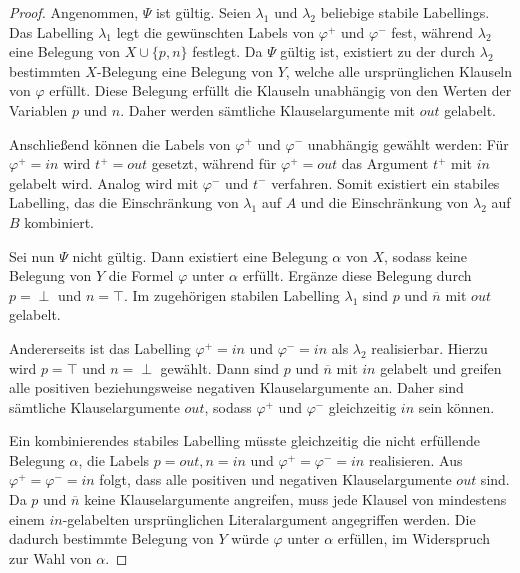 \begin{proof}
    Angenommen, \(\Psi\) ist gültig. Seien \(\lambda_1\) und \(\lambda_2\) beliebige
    stabile Labellings. Das Labelling \(\lambda_1\) legt die gewünschten Labels von
    \(\varphi^{+}\) und \(\varphi^{-}\) fest, während \(\lambda_2\) eine Belegung von
    \(X\cup\{p,n\}\) festlegt. Da \(\Psi\) gültig ist, existiert zu der durch
    \(\lambda_2\) bestimmten \(X\)-Belegung eine Belegung von \(Y\), welche alle
    ursprünglichen Klauseln von \(\varphi\) erfüllt. Diese Belegung erfüllt die
    Klauseln unabhängig von den Werten der Variablen \(p\) und \(n\). Daher werden
    sämtliche Klauselargumente mit \(out\) gelabelt.

    Anschließend können die Labels von \(\varphi^{+}\) und \(\varphi^{-}\) unabhängig
    gewählt werden: Für \(\varphi^{+}=in\) wird \(t^{+}=out\) gesetzt, während für
    \(\varphi^{+}=out\) das Argument \(t^{+}\) mit \(in\) gelabelt wird. Analog wird
    mit \(\varphi^{-}\) und \(t^{-}\) verfahren. Somit existiert ein stabiles Labelling,
    das die Einschränkung von \(\lambda_1\) auf \(A\) und die Einschränkung von
    \(\lambda_2\) auf \(B\) kombiniert.

    Sei nun \(\Psi\) nicht gültig. Dann existiert eine Belegung
    \(\alpha\) von \(X\), sodass keine Belegung von \(Y\) die Formel \(\varphi\)
    unter \(\alpha\) erfüllt. Ergänze diese Belegung durch \(p=\perp\) und \(n=\top\).
    Im zugehörigen stabilen Labelling \(\lambda_1\) sind \(p\) und \(\overline{n}\) mit \(out\)
    gelabelt.

    Andererseits ist das Labelling
    \(\varphi^{+}=in\) und \(\varphi^{-}=in\) als \(\lambda_2\) realisierbar. Hierzu wird
    \(p=\top\) und \(n=\perp\) gewählt. Dann sind \(p\) und \(\overline{n}\) mit
    \(in\) gelabelt und greifen alle positiven beziehungsweise negativen
    Klauselargumente an. Daher sind sämtliche Klauselargumente \(out\), sodass
    \(\varphi^{+}\) und \(\varphi^{-}\) gleichzeitig \(in\) sein können.

    Ein kombinierendes stabiles Labelling müsste gleichzeitig die nicht erfüllende
    Belegung \(\alpha\), die Labels \(p=out,n=in\) und
    \(\varphi^{+}=\varphi^{-}=in\) realisieren. Aus
    \(\varphi^{+}=\varphi^{-}=in\) folgt, dass alle positiven und negativen
    Klauselargumente \(out\) sind. Da \(p\text{ und } \overline{n}\) keine Klauselargumente
    angreifen, muss jede Klausel von mindestens einem \(in\)-gelabelten ursprünglichen
    Literalargument angegriffen werden. Die dadurch bestimmte Belegung von \(Y\) würde
    \(\varphi\) unter \(\alpha\) erfüllen, im Widerspruch zur Wahl von \(\alpha\).
\end{proof}

